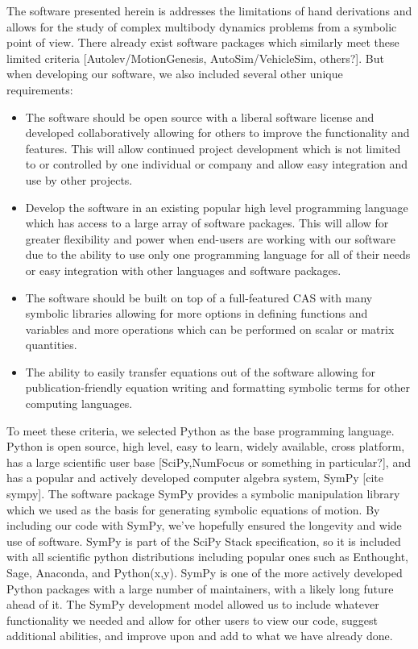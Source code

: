 \documentclass[twocolumn,10pt]{asme2e}
\begin{document}
The software presented herein is addresses the limitations of hand derivations
and allows for the study of complex multibody dynamics problems from a symbolic
point of view. There already exist software packages which similarly meet these
limited criteria [Autolev/MotionGenesis, AutoSim/VehicleSim, others?]. But when
developing our software, we also included several other unique requirements:
\begin{itemize}
  \item The software should be open source with a liberal software license and
    developed collaboratively allowing for others to improve the functionality
    and features. This will allow continued project development which is not
    limited to or controlled by one individual or company and allow easy
    integration and use by other projects.
   \item Develop the software in an existing popular high level programming
     language which has access to a large array of software packages. This will
     allow for greater flexibility and power when end-users are working with
     our software due to the ability to use only one programming language for
     all of their needs or easy integration with other languages and software
     packages.
   \item The software should be built on top of a full-featured CAS with
     many symbolic libraries allowing for more options in defining functions
     and variables and more operations which can be performed on scalar or
     matrix quantities.
   \item The ability to easily transfer equations out of the software allowing
     for publication-friendly equation writing and formatting symbolic terms
     for other computing languages.
\end{itemize}
To meet these criteria, we selected Python as the base programming language.
Python is open source, high level, easy to learn, widely available, cross
platform, has a large scientific user base [SciPy,NumFocus or something in
particular?], and has a popular and actively developed computer algebra system,
SymPy [cite sympy]. The software package SymPy provides a symbolic manipulation
library which we used as the basis for generating symbolic equations of motion.
By including our code with SymPy, we’ve hopefully ensured the longevity and
wide use of software. SymPy is part of the SciPy Stack specification, so it is
included with all scientific python distributions including popular ones such
as Enthought, Sage, Anaconda, and Python(x,y). SymPy is one of the more
actively developed Python packages with a large number of maintainers, with a
likely long future ahead of it. The SymPy development model allowed us to
include whatever functionality we needed and allow for other users to view our
code, suggest additional abilities, and improve upon and add to what we have
already done.
\end{document}
